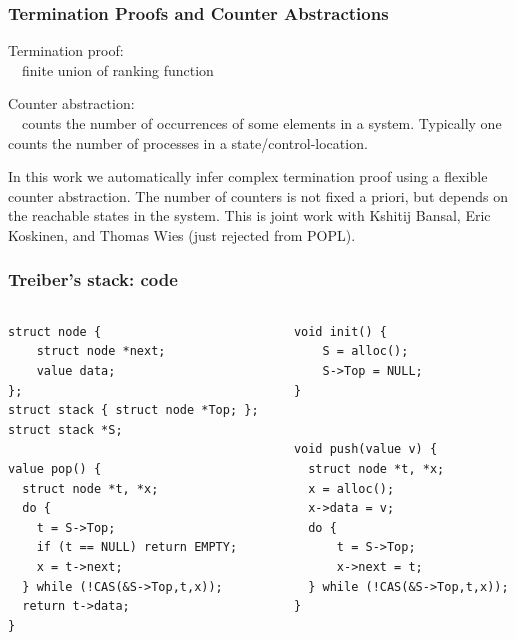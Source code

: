 \documentclass{beamer}
\begin{document}
\begin{frame}
  \frametitle{Termination Proofs and Counter Abstractions}
  Termination proof:\\
  \mbox{}~~finite union of ranking function \cite{transinv}\\

  \vspace{1ex}

  Counter abstraction:\\
  \mbox{}~~counts the number of occurrences of some elements in a system.
  Typically one counts the number of processes in a state/control-location.

  \vspace{1ex}

  In this work we automatically infer complex termination proof using a flexible counter abstraction.
  The number of counters is not fixed a priori, but depends on the reachable states in the system.
  This is joint work with Kshitij Bansal, Eric Koskinen, and Thomas Wies (just rejected from POPL).
\end{frame}

\begin{frame}[fragile]
  \frametitle{Treiber's stack: code}
  \begin{columns}
{\footnotesize
\begin{verbatim}
struct node {
    struct node *next;
    value data;
};
struct stack { struct node *Top; };
struct stack *S;

value pop() {
  struct node *t, *x;
  do {
    t = S->Top;
    if (t == NULL) return EMPTY;
    x = t->next;
  } while (!CAS(&S->Top,t,x));
  return t->data;
}
\end{verbatim}
}
{\footnotesize
\begin{verbatim}
  void init() {
      S = alloc();
      S->Top = NULL;
  }


  void push(value v) {
    struct node *t, *x;
    x = alloc();
    x->data = v;
    do {
        t = S->Top;
        x->next = t;
    } while (!CAS(&S->Top,t,x));
  }
\end{verbatim}
}
  \end{columns}

\end{frame}
\end{document}

